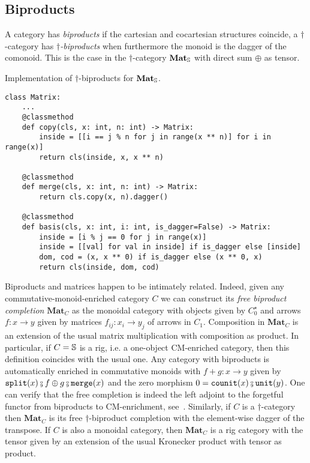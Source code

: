 \subsection{Biproducts}\label{subsection:biproducts}

A category has \emph{biproducts} if the cartesian and cocartesian structures coincide,
a $\dagger$-category has \emph{$\dagger$-biproducts} when furthermore the monoid is the dagger of the comonoid.
This is the case in the $\dagger$-category $\mathbf{Mat}_\S$ with direct sum $\oplus$ as tensor.

\begin{python}
{\normalfont Implementation of $\dagger$-biproducts for $\mathbf{Mat}_\S$.}

\begin{verbatim}
class Matrix:
    ...
    @classmethod
    def copy(cls, x: int, n: int) -> Matrix:
        inside = [[i == j % n for j in range(x ** n)] for i in range(x)]
        return cls(inside, x, x ** n)

    @classmethod
    def merge(cls, x: int, n: int) -> Matrix:
        return cls.copy(x, n).dagger()

    @classmethod
    def basis(cls, x: int, i: int, is_dagger=False) -> Matrix:
        inside = [i % j == 0 for j in range(x)]
        inside = [[val] for val in inside] if is_dagger else [inside]
        dom, cod = (x, x ** 0) if is_dagger else (x ** 0, x)
        return cls(inside, dom, cod)
\end{verbatim}
\end{python}

Biproducts and matrices happen to be intimately related.
Indeed, given any commutative-monoid-enriched category $C$ we can construct its \emph{free biproduct completion} $\mathbf{Mat}_C$ as the monoidal category with objects given by $C_0^\star$ and arrows $f : x \to y$ given by matrices $f_{ij} : x_i \to y_j$ of arrows in $C_1$.
Composition in $\mathbf{Mat}_C$ is an extension of the usual matrix multiplication with composition as product.
In particular, if $C = \S$ is a rig, i.e. a one-object CM-enriched category, then this definition coincides with the usual one.
Any category with biproducts is automatically enriched in commutative monoids with $f + g : x \to y$ given by $\ttsplit(x) \fcmp f \oplus g \fcmp \merge(x)$ and the zero morphism $0 = \counit(x) \fcmp \unit(y)$.
One can verify that the free completion is indeed the left adjoint to the forgetful functor from biproducts to CM-enrichment, see~\cite[Exercise VIII.2.6]{MacLane71}.
Similarly, if $C$ is a $\dagger$-category then $\mathbf{Mat}_C$ is its free $\dagger$-biproduct completion with the element-wise dagger of the transpose.
If $C$ is also a monoidal category, then $\mathbf{Mat}_C$ is a rig category with the tensor given by an extension of the usual Kronecker product with tensor as product.


